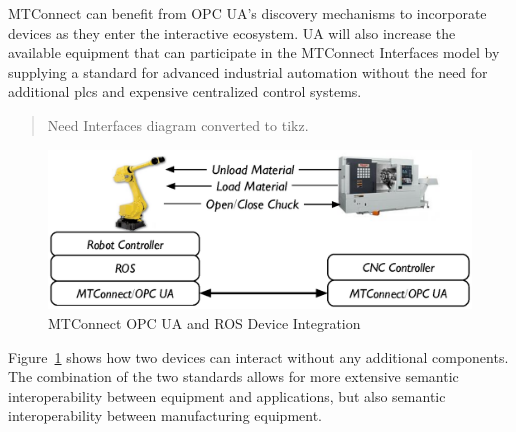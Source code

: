 MTConnect can benefit from OPC UA's discovery mechanisms to incorporate devices as they enter the interactive ecosystem.  UA will also increase the available equipment that can participate in the MTConnect Interfaces model by supplying a standard for advanced industrial automation without the need for additional \glspl{plc} and expensive centralized control systems.

\begin{quote}
  \color{red}  Need Interfaces diagram converted to tikz.
\end{quote}

\begin{figure}[ht]
    \centering
    \includegraphics[width=\textwidth]{diagrams/device-integration.eps}
    \caption{MTConnect OPC UA and ROS Device Integration}
    \label{fig:mtconnect-ros-opc}
\end{figure}

Figure~\ref{fig:mtconnect-ros-opc} shows how two devices can interact without any additional components. The combination of the two standards allows for more extensive semantic interoperability between equipment and applications,  but also semantic interoperability between manufacturing equipment. 

\FloatBarrier

